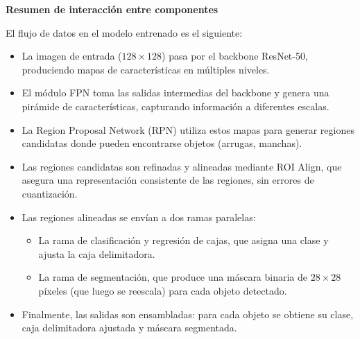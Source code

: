 \begin{enumerate}
\begin{itemize}
\vspace{0.5cm}

\textbf{Resumen de interacción entre componentes}

El flujo de datos en el modelo entrenado es el siguiente:

\begin{itemize}
    \item La imagen de entrada ($128 \times 128$) pasa por el backbone ResNet-50, produciendo mapas de características en múltiples niveles.
    
    \item El módulo FPN toma las salidas intermedias del backbone y genera una pirámide de características, capturando información a diferentes escalas.
    
    \item La Region Proposal Network (RPN) utiliza estos mapas para generar regiones candidatas donde pueden encontrarse objetos (arrugas, manchas).
    
    \item Las regiones candidatas son refinadas y alineadas mediante ROI Align, que asegura una representación consistente de las regiones, sin errores de cuantización.
    
    \item Las regiones alineadas se envían a dos ramas paralelas:
    \begin{itemize}
        \item La rama de clasificación y regresión de cajas, que asigna una clase y ajusta la caja delimitadora.
        \item La rama de segmentación, que produce una máscara binaria de $28 \times 28$ píxeles (que luego se reescala) para cada objeto detectado.
    \end{itemize}
    
    \item Finalmente, las salidas son ensambladas: para cada objeto se obtiene su clase, caja delimitadora ajustada y máscara segmentada.
\end{itemize}

  \end{itemize}
\end{enumerate}


